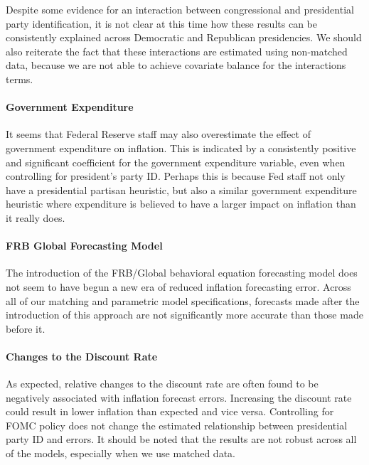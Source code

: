 \documentclass[a4paper]{article}\usepackage{graphicx, color}
\begin{document}
Despite some evidence for an interaction between congressional and presidential party identification, it is not clear at this time how these results can be consistently explained across Democratic and Republican presidencies. We should also reiterate the fact that these interactions are estimated using non-matched data, because we are not able to achieve covariate balance for the interactions terms.

\paragraph{Government Expenditure}

It seems that Federal Reserve staff may also overestimate the effect of government expenditure on inflation. This is indicated by a consistently positive and significant coefficient for the government expenditure variable, even when controlling for president's party ID. Perhaps this is because Fed staff not only have a presidential partisan heuristic, but also a similar government expenditure heuristic where expenditure is believed to have a larger impact on inflation than it really does.

\paragraph{FRB Global Forecasting Model}

The introduction of the FRB/Global behavioral equation forecasting model does not seem to have begun a new era of reduced inflation forecasting error. Across all of our matching and parametric model specifications, forecasts made after the introduction of this approach are not significantly more accurate than those made before it. 

\paragraph{Changes to the Discount Rate}

As expected, relative changes to the discount rate are often found to be negatively associated with inflation forecast errors. Increasing the discount rate could result in lower inflation than expected and vice versa. Controlling for FOMC policy does not change the estimated relationship between presidential party ID and errors. It should be noted that the results are not robust across all of the models, especially when we use matched data. 
\end{document}
